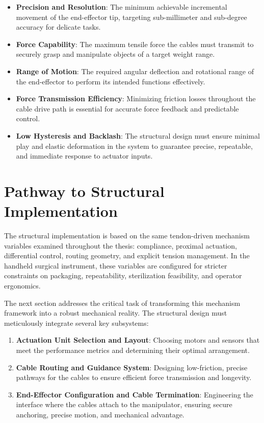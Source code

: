 \begin{itemize}
\item \textbf{Precision and Resolution}: The minimum achievable incremental movement of the end-effector tip, targeting sub-millimeter and sub-degree accuracy for delicate tasks.

\item \textbf{Force Capability}: The maximum tensile force the cables must transmit to securely grasp and manipulate objects of a target weight range.

\item \textbf{Range of Motion}: The required angular deflection and rotational range of the end-effector to perform its intended functions effectively.

\item \textbf{Force Transmission Efficiency}: Minimizing friction losses throughout the cable drive path is essential for accurate force feedback and predictable control.

\item \textbf{Low Hysteresis and Backlash}: The structural design must ensure minimal play and elastic deformation in the system to guarantee precise, repeatable, and immediate response to actuator inputs.
\end{itemize}

\section{Pathway to Structural Implementation}
The structural implementation is based on the same tendon-driven mechanism variables examined throughout the thesis: compliance, proximal actuation, differential control, routing geometry, and explicit tension management. In the handheld surgical instrument, these variables are configured for stricter constraints on packaging, repeatability, sterilization feasibility, and operator ergonomics.

The next section addresses the critical task of transforming this mechanism framework into a robust mechanical reality. The structural design must meticulously integrate several key subsystems:
\begin{enumerate}
    \item \textbf{Actuation Unit Selection and Layout}: Choosing motors and sensors that meet the performance metrics and determining their optimal arrangement.

    \item \textbf{Cable Routing and Guidance System}: Designing low-friction, precise pathways for the cables to ensure efficient force transmission and longevity.

    \item \textbf{End-Effector Configuration and Cable Termination}: Engineering the interface where the cables attach to the manipulator, ensuring secure anchoring, precise motion, and mechanical advantage.

\end{enumerate}


